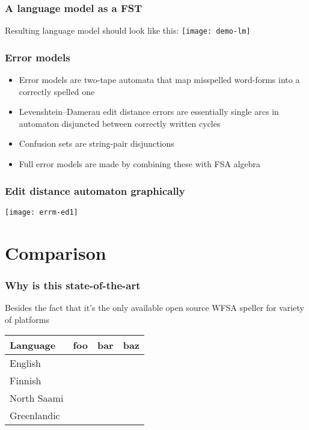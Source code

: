 \documentclass[t,12pt]{beamer}
\begin{document}
\begin{frame}
    \frametitle{A language model as a FST}
    Resulting language model should look like this:
    \texttt{[image: demo-lm]}
\end{frame}

\begin{frame}
   \frametitle{Error models}
   \begin{itemize}
       \item Error models are two-tape automata that map misspelled word-forms
           into a correctly spelled one
       \item Levenshtein--Damerau edit distance errors are essentially single
           arcs in automaton disjuncted between correctly written cycles
       \item Confusion sets are string-pair disjunctions
       \item Full error models are made by combining these with FSA algebra
   \end{itemize}
\end{frame}

\begin{frame}
    \frametitle{Edit distance automaton graphically}
    \texttt{[image: errm-ed1]}
\end{frame}

\section{Comparison}

\begin{frame}
    \frametitle{Why is this state-of-the-art}
    \tiny{Besides the fact that it's the only available open source WFSA speller
        for variety of platforms\hyperlink{links}{}}\\
        \begin{table}
            \begin{tabular}{l|rrr}
                \textbf{Language} & foo & bar & baz \\
                \hline
                English & & & \\
                Finnish & & & \\
                North Saami & & & \\
                Greenlandic & & & \\
            \end{tabular}
        \end{table}
\end{frame}
\end{document}

